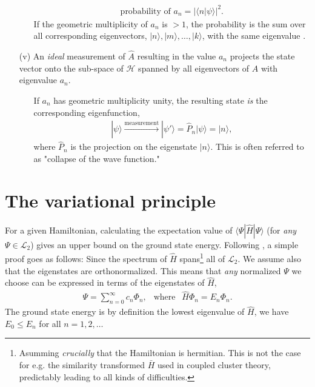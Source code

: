 \documentclass[../../master.tex]{subfiles}
\begin{document}
\begin{itemize}
\begin{itemize}
    \begin{align}
    \text{probability of }a_n = |\langle n|\psi\rangle|^2.
    \end{align}
    If the geometric multiplicity of $a_n$ is $>1$, the probability is the sum over all corresponding eigenvectors, $|n\rangle,|m\rangle,\dots,|k\rangle$, with the same eigenvalue \cite{lay}.
  \end{itemize}
  \item[(v)] An \emph{ideal} measurement of $\hat A$ resulting in the value $a_n$ projects the state vector onto the sub-space of $\mathcal{H}$ spanned by all eigenvectors of $\hat A$ with eigenvalue $a_n$. 
  \begin{itemize}
    \item[] If $a_n$ has geometric multiplicity unity, the resulting state \emph{is} the corresponding eigenfunction,
    \begin{align}
    |\psi\rangle \xrightarrow{\text{measurement}} |\psi'\rangle = \hat P_n |\psi\rangle = |n\rangle,
    \end{align}
    where $\hat P_n$ is the projection on the eigenstate $|n\rangle$. This is often referred to as "collapse of the wave function."
  \end{itemize}
\end{itemize}



\section{The variational principle}
For a given Hamiltonian, calculating the expectation value of $\langle \Psi | \hat H | \Psi\rangle$ (for \emph{any} $\Psi\in\mathcal{L}_2$) gives an upper bound on the ground state energy. Following \cite{griffiths}, a simple proof goes as follows: Since the spectrum of $\hat H$ spans\footnote{Asumming \emph{crucially} that the Hamiltonian is hermitian. This is not the case for e.g. the similarity transformed $\bar H$ used in coupled cluster theory, predictably leading to all kinds of difficulties.} all of $\mathcal{L}_2$. We assume also that the eigenstates are orthonormalized. This means that \emph{any} normalized $\Psi$ we choose can be expressed in terms of the eigenstates of $\hat H$,
\begin{align}
\Psi = \sum_{n=0}^\infty c_n \Phi_n, \ \ \text{ where } \ \ \hat H \Phi_n = E_n \Phi_n.
\end{align}
The ground state energy is by definition the lowest eigenvalue of $\hat H$, we have $E_0\le E_n$ for all $n=1,2,\dots$
\end{document}
